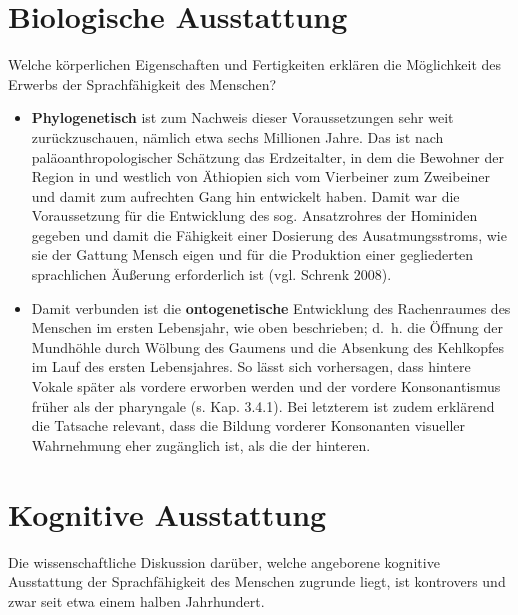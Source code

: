 \documentclass[
  letterpaper,
]{scrbook}
\begin{document}
\hypertarget{biologische-ausstattung}{%
\section{Biologische Ausstattung}\label{biologische-ausstattung}}

Welche körperlichen Eigenschaften und Fertigkeiten erklären die
Möglichkeit des Erwerbs der Sprachfähigkeit des Menschen?

\begin{itemize}
\item
  \textbf{Phylogenetisch} ist zum Nachweis dieser Voraussetzungen sehr
  weit zurückzuschauen, nämlich etwa sechs Millionen Jahre. Das ist nach
  paläoanthropologischer Schätzung das Erdzeitalter, in dem die Bewohner
  der Region in und westlich von Äthiopien sich vom Vierbeiner zum
  Zweibeiner und damit zum aufrechten Gang hin entwickelt haben. Damit
  war die Voraussetzung für die Entwicklung des sog. Ansatzrohres der
  Hominiden gegeben und damit die Fähigkeit einer Dosierung des
  Ausatmungsstroms, wie sie der Gattung Mensch eigen und für die
  Produktion einer gegliederten sprachlichen Äußerung erforderlich ist
  (vgl. Schrenk 2008).
\item
  Damit verbunden ist die \textbf{ontogenetische} Entwicklung des
  Rachenraumes des Menschen im ersten Lebensjahr, wie oben beschrieben;
  d.~h. die Öffnung der Mundhöhle durch Wölbung des Gaumens und die
  Absenkung des Kehlkopfes im Lauf des ersten Lebensjahres. So lässt
  sich vorhersagen, dass hintere Vokale später als vordere erworben
  werden und der vordere Konsonantismus früher als der pharyngale (s.
  Kap. 3.4.1). Bei letzterem ist zudem erklärend die Tatsache relevant,
  dass die Bildung vorderer Konsonanten visueller Wahrnehmung eher
  zugänglich ist, als die der hinteren.\\
\end{itemize}

\hypertarget{kognitive-ausstattung}{%
\section{Kognitive Ausstattung}\label{kognitive-ausstattung}}

Die wissenschaftliche Diskussion darüber, welche angeborene kognitive
Ausstattung der Sprachfähigkeit des Menschen zugrunde liegt, ist
kontrovers und zwar seit etwa einem halben Jahrhundert.
\end{document}

